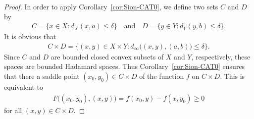 \documentclass[10pt,a4paper]{amsart}
\begin{document}
\begin{proof}
 In order to apply Corollary~\ref{cor:Sion-CAT0}, 
 we define two sets $C$ and $D$ by 
 \begin{align}
  C=\{x\in X:d_X(x,a)\leq \delta\}
 \quad \textrm{and} \quad 
  D=\{y\in Y: d_Y(y,b)\leq \delta\}. 
 \end{align}
 It is obvious that 
 \begin{align}
  C\times D = \{(x,y)\in X\times Y: d_{\infty}
 \bigl((x,y), (a,b)\bigr) \leq \delta\}. 
 \end{align}
 Since $C$ and $D$ are bounded closed convex subsets of 
 $X$ and $Y$, respectively, these spaces are bounded Hadamard spaces. 
 Thus Corollary~\ref{cor:Sion-CAT0} ensures that 
 there a saddle point $(x_0, y_0) \in C\times D$ 
 of the function $f$ on $C\times D$. 
 This is equivalent to 
 \begin{align}\label{eq:thm:minimax-coercive-a}
  F\bigl((x_0,y_0), (x,y)\bigr) 
 = f(x_0, y) - f(x, y_0) \geq 0
 \end{align}
 for all $(x,y) \in C\times D$. 


\end{proof}
\end{document}
